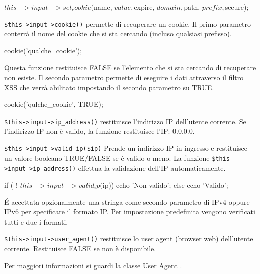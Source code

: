 \begin{code}
$this->input->set_cookie($name, $value, $expire, $domain, $path, $prefix, $secure);
\end{code}

\verb|$this->input->cookie()| permette di recuperare un cookie. Il primo parametro conterrà il nome del cookie che si sta cercando (incluso qualsiasi prefisso).

\begin{code}
cookie('qualche_cookie');
\end{code}

Questa funzione restituisce FALSE se l'elemento che si sta cercando di recuperare non esiste. Il secondo parametro permette di eseguire i dati attraverso il filtro \ac{XSS} che verrà abilitato impostando il secondo parametro su TRUE.

\begin{code}
cookie('qulche_cookie', TRUE);
\end{code}

\verb|$this->input->ip_address()| restituisce l'indirizzo IP dell'utente corrente. Se l'indirizzo IP non è valido, la funzione restituisce l'IP: 0.0.0.0.


\verb|$this->input->valid_ip($ip)| Prende un indirizzo IP in ingresso e restituisce un valore booleano TRUE/FALSE se è valido o meno. La funzione \verb|$this->input->ip_address()| effettua la validazione dell'IP automaticamente.

\begin{code}
if ( ! $this->input->valid_ip($ip))
{
     echo 'Non valido';
}
else
{
     echo 'Valido';
}
\end{code}

\'E accettata opzionalmente una stringa come secondo parametro di IPv4 oppure IPv6 per specificare il formato IP. Per impostazione predefinita vengono verificati tutti e due i formati.

\verb|$this->input->user_agent()| restituisce lo user agent (browser web) dell'utente corrente. Restituisce FALSE se non è disponibile.


Per maggiori informazioni si guardi la classe User Agent .

